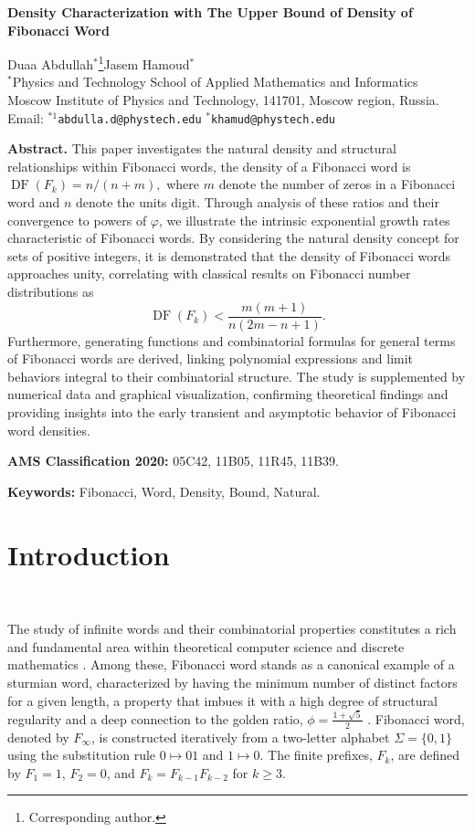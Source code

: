\documentclass[11pt, a4paper]{article}
\theoremstyle{definition}
\begin{document}
\begin{center}
{\large \bf Density Characterization with The Upper Bound of Density of Fibonacci Word}
\end{center}
\begin{center}
 Duaa Abdullah$^{*}$\footnote{Corresponding author.}\quad Jasem Hamoud$^{*}$\\[6pt]
 $^{*}$Physics and Technology School of Applied Mathematics and Informatics \\
Moscow Institute of Physics and Technology, 141701, Moscow region, Russia.\\[6pt]
Email: $^{*1}${\tt abdulla.d@phystech.edu} \quad $^{*}${\tt khamud@phystech.edu}
\end{center}
\noindent
\textbf{Abstract.}
This paper investigates the natural density and structural relationships within Fibonacci words, the density of a Fibonacci word is $\operatorname{DF}(F_k)=n/(n+m),$ where $m$ denote the number of zeros in a Fibonacci word and $n$ denote the units digit. Through analysis of these ratios and their convergence to powers of $\varphi$, we illustrate the intrinsic exponential growth rates characteristic of Fibonacci words. By considering the natural density concept for sets of positive integers, it is demonstrated that the density of Fibonacci words approaches unity, correlating with classical results on Fibonacci number distributions as 
\[
\operatorname{DF}(F_k) <\frac{m(m+1)}{n(2m-n+1)}.
\]
Furthermore, generating functions and combinatorial formulas for general terms of Fibonacci words are derived, linking polynomial expressions and limit behaviors integral to their combinatorial structure. The study is supplemented by numerical data and graphical visualization, confirming theoretical findings and providing insights into the early transient and asymptotic behavior of Fibonacci word densities.



\noindent\textbf{AMS Classification 2020:}  05C42, 11B05, 11R45, 11B39.


\noindent\textbf{Keywords:} Fibonacci, Word, Density, Bound, Natural.

\section{Introduction}~\label{sec1}

The study of infinite words and their combinatorial properties constitutes a rich and fundamental area within theoretical computer science and discrete mathematics \cite{Lothaire2002}. Among these, Fibonacci word stands as a canonical example of a sturmian word, characterized by having the minimum number of distinct factors for a given length, a property that imbues it with a high degree of structural regularity and a deep connection to the golden ratio, $\phi = \frac{1+\sqrt{5}}{2}$ \cite{Allouche2003}. Fibonacci word, denoted by $F_{\infty}$, is constructed iteratively from a two-letter alphabet $\Sigma = \{0, 1\}$ using the substitution rule $0 \mapsto 01$ and $1 \mapsto 0$. The finite prefixes, $F_k$, are defined by $F_1 = 1$, $F_2 = 0$, and $F_k = F_{k-1} F_{k-2}$ for $k \ge 3$.
\end{document}
